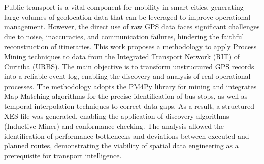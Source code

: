 
\begin{abstractutfpr}%
Public transport is a vital component for mobility in smart cities, generating large volumes of geolocation data that can be leveraged to improve operational management. However, the direct use of raw GPS data faces significant challenges due to noise, inaccuracies, and communication failures, hindering the faithful reconstruction of itineraries. This work proposes a methodology to apply Process Mining techniques to data from the Integrated Transport Network (RIT) of Curitiba (URBS). The main objective is to transform unstructured GPS records into a reliable event log, enabling the discovery and analysis of real operational processes. The methodology adopts the PM4Py library for mining and integrates Map Matching algorithms for the precise identification of bus stops, as well as temporal interpolation techniques to correct data gaps. As a result, a structured XES file was generated, enabling the application of discovery algorithms (Inductive Miner) and conformance checking. The analysis allowed the identification of performance bottlenecks and deviations between executed and planned routes, demonstrating the viability of spatial data engineering as a prerequisite for transport intelligence.
\end{abstractutfpr}
